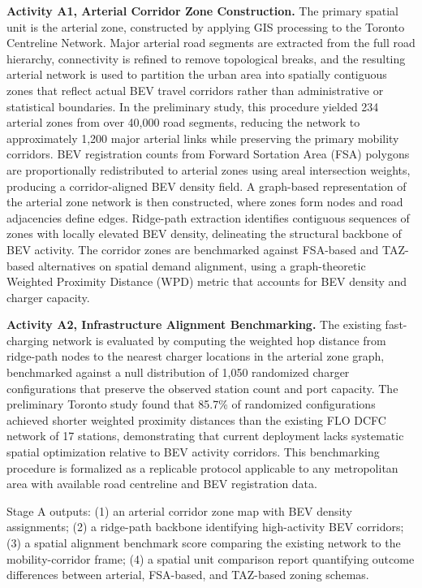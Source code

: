 \documentclass[letterpaper, 12pt, oneside, doublespacing]{Thesis}
\begin{document}
\noindent \textbf{Activity A1, Arterial Corridor Zone Construction.} The primary spatial unit is the arterial zone, constructed by applying GIS processing to the Toronto Centreline Network. Major arterial road segments are extracted from the full road hierarchy, connectivity is refined to remove topological breaks, and the resulting arterial network is used to partition the urban area into spatially contiguous zones that reflect actual BEV travel corridors rather than administrative or statistical boundaries. In the preliminary study, this procedure yielded 234 arterial zones from over 40,000 road segments, reducing the network to approximately 1,200 major arterial links while preserving the primary mobility corridors. BEV registration counts from Forward Sortation Area (FSA) polygons are proportionally redistributed to arterial zones using areal intersection weights, producing a corridor-aligned BEV density field. A graph-based representation of the arterial zone network is then constructed, where zones form nodes and road adjacencies define edges. Ridge-path extraction identifies contiguous sequences of zones with locally elevated BEV density, delineating the structural backbone of BEV activity. The corridor zones are benchmarked against FSA-based and TAZ-based alternatives on spatial demand alignment, using a graph-theoretic Weighted Proximity Distance (WPD) metric that accounts for BEV density and charger capacity.



\noindent \textbf{Activity A2, Infrastructure Alignment Benchmarking.} The existing fast-charging network is evaluated by computing the weighted hop distance from ridge-path nodes to the nearest charger locations in the arterial zone graph, benchmarked against a null distribution of 1,050 randomized charger configurations that preserve the observed station count and port capacity. The preliminary Toronto study found that 85.7\% of randomized configurations achieved shorter weighted proximity distances than the existing FLO DCFC network of 17 stations, demonstrating that current deployment lacks systematic spatial optimization relative to BEV activity corridors. This benchmarking procedure is formalized as a replicable protocol applicable to any metropolitan area with available road centreline and BEV registration data.


Stage A outputs: (1) an arterial corridor zone map with BEV density assignments; (2) a ridge-path backbone identifying high-activity BEV corridors; (3) a spatial alignment benchmark score comparing the existing network to the mobility-corridor frame; (4) a spatial unit comparison report quantifying outcome differences between arterial, FSA-based, and TAZ-based zoning schemas.
\end{document}
